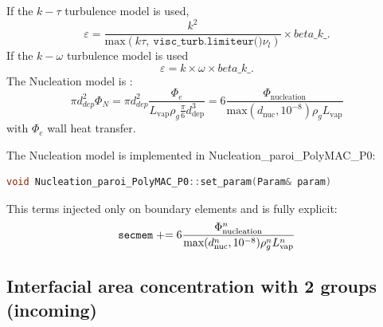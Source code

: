 If the $k-\tau$ turbulence model is used, 
\begin{equation}
\varepsilon=\frac{k^2}{\text{max}(k\tau,\ \texttt{visc_turb.limiteur()} \nu_l)}\times beta\_ k \_.
\end{equation}
If the $k-\omega$ turbulence model is used
\begin{equation}
\varepsilon=k\times \omega\times beta\_ k \_.
\end{equation}
The {\colorbox{codebackground}{\color{codekeyword3}  Nucleation}} model is : 
\begin{equation}
		\pi d_{dep}^2\Phi_N = \pi d_{dep}^2\frac{\Phi_{e}}{L_{\text{vap}} \rho_g \frac{\pi}{6}d_\text{dep}^3}=6\frac{\Phi_{\text{nucleation}}}{\text{max}(d_{\text{nuc}},10^{-8})\rho_g L_{\text{vap}}}
\end{equation}
with $\Phi_{e}$ wall heat transfer.

The {\colorbox{codebackground}{\color{codekeyword3}  Nucleation}} model is implemented in Nucleation_paroi_PolyMAC_P0: 
\begin{lstlisting}[language=c++]
void Nucleation_paroi_PolyMAC_P0::set_param(Param& param)
\end{lstlisting}
This terms injected only on boundary elements and is fully explicit: 
\begin{equation}
    \texttt{secmem} \mathrel{+}= 6\frac{\Phi_{\text{nucleation}}^n}{\text{max}(d_{\text{nuc}}^n,10^{-8})\rho_g^n L_{\text{vap}}^n}
\end{equation}

\subsection{Interfacial area concentration with 2 groups (incoming)}

%

